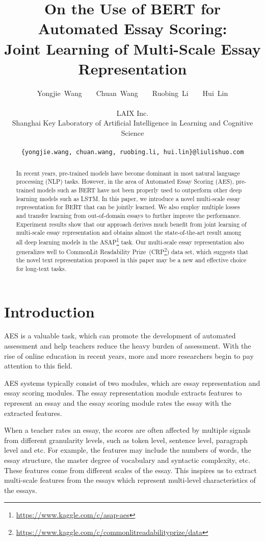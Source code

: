 \documentclass[11pt]{article}
\title{On the Use of BERT for Automated Essay Scoring:\\ Joint Learning of Multi-Scale Essay Representation}
\author{
Yongjie~Wang~~~~Chuan~Wang~~~~Ruobing~Li~~~~Hui~Lin\\\\
LAIX Inc.\\
Shanghai Key Laboratory of Artificial Intelligence in Learning and Cognitive Science \\\\
\texttt{\{yongjie.wang, chuan.wang, ruobing.li, hui.lin\}@liulishuo.com} 
}
\date{}
\begin{document}
\maketitle
\begin{abstract}
In recent years, pre-trained models have become dominant in most natural language processing (NLP) tasks.
However, in the area of Automated Essay Scoring (AES), pre-trained models such as BERT have not been properly used to outperform other deep learning models such as LSTM.
In this paper, we introduce a novel multi-scale essay representation for BERT that can be jointly learned.
We also employ multiple losses and transfer learning from out-of-domain essays to further improve the performance.
Experiment results show that our approach derives much benefit from joint learning of multi-scale essay representation and obtains almost the state-of-the-art result among all deep learning models in the ASAP\footnote{\url{https://www.kaggle.com/c/asap-aes}} task.
Our multi-scale essay representation also generalizes well to CommonLit Readability Prize~(CRP\footnote{\url{https://www.kaggle.com/c/commonlitreadabilityprize/data}}) data set, which suggests that the novel text representation proposed in this paper may be a new and effective choice for long-text tasks.\end{abstract}

\section{Introduction}

AES is a valuable task, which can promote the development of automated assessment and help teachers reduce the heavy burden of assessment.
With the rise of online education in recent years, more and more researchers begin to pay attention to this field.

AES systems typically consist of two modules, which are essay representation and essay scoring modules. The essay representation module extracts features to represent an essay and the essay scoring module rates the essay with the extracted features.


When a teacher rates an essay, the scores are often affected by multiple signals from different granularity levels, such as token level, sentence level, paragraph level and etc.
For example, the features may include the numbers of words, the essay structure, the master degree of vocabulary and syntactic complexity, etc.
These features come from different scales of the essay.
This inspires us to extract multi-scale features from the essays which represent multi-level characteristics of the essays.
\end{document}
